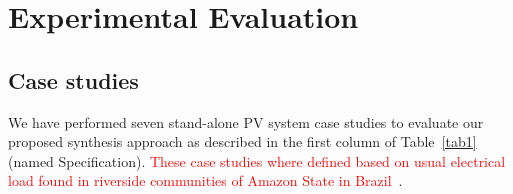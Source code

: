 \documentclass[review]{elsarticle}
\begin{document}
\section{Experimental Evaluation}
\label{sec:Results}

\subsection{Case studies} 

We have performed seven stand-alone PV system case studies to evaluate our proposed synthesis approach as described in the first column of Table~\ref{tab1} (named Specification). \textcolor{red}{These case studies where defined based on usual electrical load found in riverside communities of Amazon State in Brazil~\cite{abs-1811-09438, Agrener2013}}. 
\end{document}
